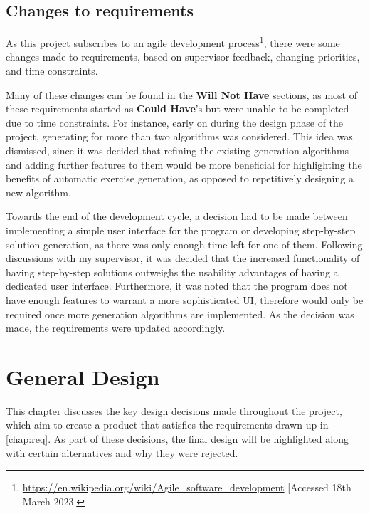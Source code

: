 \documentclass{l4proj}
\begin{document}
\section{Changes to requirements}

As this project subscribes to an agile development process\footnote{\url{https://en.wikipedia.org/wiki/Agile_software_development} [Accessed 18th March 2023]}, there were some changes made to requirements, based on supervisor feedback, changing priorities, and time constraints.

Many of these changes can be found in the \textbf{Will Not Have} sections, as most of these requirements started as \textbf{Could Have}'s but were unable to be completed due to time constraints. For instance, early on during the design phase of the project, generating for more than two algorithms was considered. This idea was dismissed, since it was decided that refining the existing generation algorithms and adding further features to them would be more beneficial for highlighting the benefits of automatic exercise generation, as opposed to repetitively designing a new algorithm. 

Towards the end of the development cycle, a decision had to be made between implementing a simple user interface for the program or developing step-by-step solution generation, as there was only enough time left for one of them. Following discussions with my supervisor, it was decided that the increased functionality of having step-by-step solutions outweighs the usability advantages of having a dedicated user interface. Furthermore, it was noted that the program does not have enough features to warrant a more sophisticated UI, therefore would only be required once more generation algorithms are implemented. As the decision was made, the requirements were updated accordingly.


\chapter{General Design}
\label{chap:des}

This chapter discusses the key design decisions made throughout the project, which aim to create a product that satisfies the requirements drawn up in \autoref{chap:req}. As part of these decisions, the final design will be highlighted along with certain alternatives and why they were rejected.
\end{document}
